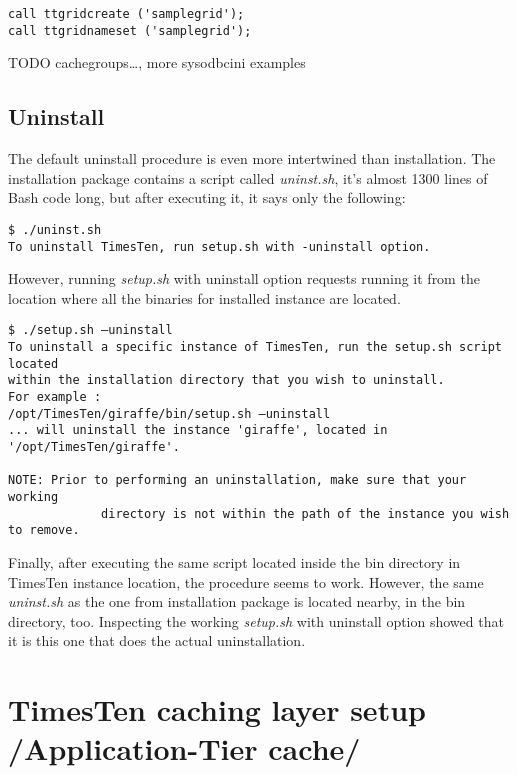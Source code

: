 \documentclass[11pt, letterpaper]{article}
\begin{document}
\begin{lstlisting}
call ttgridcreate ('samplegrid');
call ttgridnameset ('samplegrid');
\end{lstlisting}

TODO cachegroups…, more sysodbcini examples

\subsection{Uninstall}

The default uninstall procedure is even more intertwined than installation. The installation package contains a script called \emph{uninst.sh}, it’s almost 1300 lines of Bash code long, but after executing it, it says only the following:

\begin{lstlisting}
$ ./uninst.sh
To uninstall TimesTen, run setup.sh with -uninstall option.
\end{lstlisting}

However, running \emph{setup.sh} with uninstall option requests running it from the location where all the binaries for installed instance are located.

\begin{lstlisting}
$ ./setup.sh –uninstall
To uninstall a specific instance of TimesTen, run the setup.sh script located
within the installation directory that you wish to uninstall.
For example :
/opt/TimesTen/giraffe/bin/setup.sh –uninstall
... will uninstall the instance 'giraffe', located in '/opt/TimesTen/giraffe'.

NOTE: Prior to performing an uninstallation, make sure that your working
             directory is not within the path of the instance you wish to remove.

\end{lstlisting}
 
Finally, after executing the same script located inside the bin directory in TimesTen instance location, the procedure seems to work. However, the same \emph{uninst.sh} as the one from installation package is located nearby, in the bin directory, too. Inspecting the working \emph{setup.sh} with uninstall option showed that it is this one that does the actual uninstallation.


\section{TimesTen caching layer setup /Application-Tier cache/}
\end{document}
